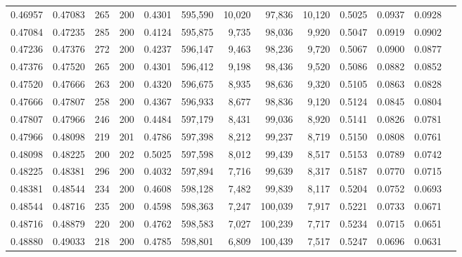 \begin{tabular}{rrrrrrrrrrrrr}
0.46957 & 0.47083 &   265 & 200 &                                     0.4301 & 595,590 &  10,020 &  97,836 &  10,120 & 0.5025 & 0.0937 & 0.0928 \\
0.47084 & 0.47235 &   285 & 200 &                                     0.4124 & 595,875 &   9,735 &  98,036 &   9,920 & 0.5047 & 0.0919 & 0.0902 \\
0.47236 & 0.47376 &   272 & 200 &                                     0.4237 & 596,147 &   9,463 &  98,236 &   9,720 & 0.5067 & 0.0900 & 0.0877 \\
0.47376 & 0.47520 &   265 & 200 &                                     0.4301 & 596,412 &   9,198 &  98,436 &   9,520 & 0.5086 & 0.0882 & 0.0852 \\
0.47520 & 0.47666 &   263 & 200 &                                     0.4320 & 596,675 &   8,935 &  98,636 &   9,320 & 0.5105 & 0.0863 & 0.0828 \\
0.47666 & 0.47807 &   258 & 200 &                                     0.4367 & 596,933 &   8,677 &  98,836 &   9,120 & 0.5124 & 0.0845 & 0.0804 \\
0.47807 & 0.47966 &   246 & 200 &                                     0.4484 & 597,179 &   8,431 &  99,036 &   8,920 & 0.5141 & 0.0826 & 0.0781 \\
0.47966 & 0.48098 &   219 & 201 &                                     0.4786 & 597,398 &   8,212 &  99,237 &   8,719 & 0.5150 & 0.0808 & 0.0761 \\
0.48098 & 0.48225 &   200 & 202 &                                     0.5025 & 597,598 &   8,012 &  99,439 &   8,517 & 0.5153 & 0.0789 & 0.0742 \\
0.48225 & 0.48381 &   296 & 200 &                                     0.4032 & 597,894 &   7,716 &  99,639 &   8,317 & 0.5187 & 0.0770 & 0.0715 \\
0.48381 & 0.48544 &   234 & 200 &                                     0.4608 & 598,128 &   7,482 &  99,839 &   8,117 & 0.5204 & 0.0752 & 0.0693 \\
0.48544 & 0.48716 &   235 & 200 &                                     0.4598 & 598,363 &   7,247 & 100,039 &   7,917 & 0.5221 & 0.0733 & 0.0671 \\
0.48716 & 0.48879 &   220 & 200 &                                     0.4762 & 598,583 &   7,027 & 100,239 &   7,717 & 0.5234 & 0.0715 & 0.0651 \\
0.48880 & 0.49033 &   218 & 200 &                                     0.4785 & 598,801 &   6,809 & 100,439 &   7,517 & 0.5247 & 0.0696 & 0.0631 \\

\end{tabular}
